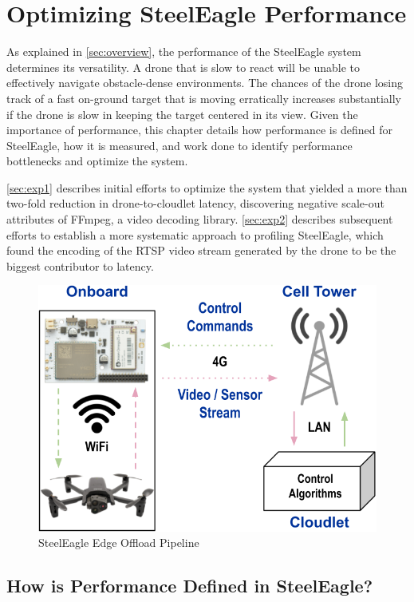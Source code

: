 \chapter{Optimizing SteelEagle Performance}
\label{ch:optimizing-steeleagle}

As explained in \cref{sec:overview}, the performance of the SteelEagle system
determines its versatility. A drone that is slow to react will be unable to
effectively navigate obstacle-dense environments. The chances of the drone
losing track of a fast on-ground target that is moving erratically increases
substantially if the drone is slow in keeping the target centered in its view.
Given the importance of performance, this chapter details how performance is
defined for SteelEagle, how it is measured, and work done to identify
performance bottlenecks and optimize the system.

\cref{sec:exp1} describes initial efforts to optimize the system that yielded a
more than two-fold reduction in drone-to-cloudlet latency, discovering negative
scale-out attributes of FFmpeg, a video decoding library.  \cref{sec:exp2}
describes subsequent efforts to establish a more systematic approach to
profiling SteelEagle, which found the encoding of the RTSP video stream
generated by the drone to be the biggest contributor to latency.

\begin{figure}[htbp]
\centerline{\includegraphics[width = .5\textwidth]{figs/fig-simplified-arch.png}}
\caption{SteelEagle Edge Offload Pipeline}
\label{fig:simplified-arch}
\end{figure}

\section{How is Performance Defined in SteelEagle?}
\label{sec:steeleagle-performance-def}

